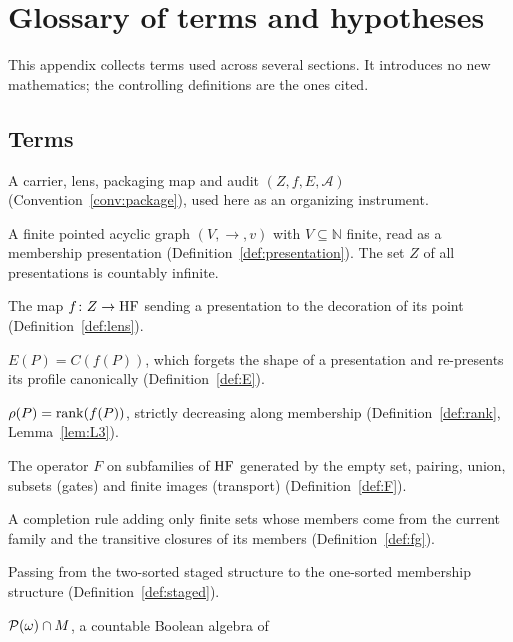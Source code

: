 \section{Glossary of terms and hypotheses}\label{app:definitions}

This appendix collects terms used across several sections. It introduces no new mathematics; the
controlling definitions are the ones cited.

\subsection{Terms}\label{subsec:definitions-list}

\begin{description}[style=multiline,leftmargin=!,labelwidth=0.27\textwidth,labelsep=0.8em,itemsep=3pt]
\item[Theory package.] A carrier, lens, packaging map and audit $(Z,f,E,\mathcal A)$
(Convention~\ref{conv:package}), used here as an organizing instrument.
\item[Presentation.] A finite pointed acyclic graph $(V,\to,v)$ with $V\subseteq\mathbb N$ finite,
read as a membership presentation (Definition~\ref{def:presentation}). The set $Z$ of all
presentations is countably infinite.
\item[Membership-profile lens.] The map $f\colon Z\to\mathrm{HF}$ sending a presentation to the decoration
of its point (Definition~\ref{def:lens}).
\item[Packaging map.] $E(P)=C(f(P))$, which forgets the shape of a presentation and re-presents its
profile canonically (Definition~\ref{def:E}).
\item[Rank audit.] $\rho(P)=\operatorname{rank}(f(P))$, strictly decreasing along membership
(Definition~\ref{def:rank}, Lemma~\ref{lem:L3}).
\item[Finite packaging operator.] The operator $F$ on subfamilies of $\mathrm{HF}$ generated by the empty
set, pairing, union, subsets (gates) and finite images (transport) (Definition~\ref{def:F}).
\item[Finitely generated rule.] A completion rule adding only finite sets whose members come from
the current family and the transitive closures of its members (Definition~\ref{def:fg}).
\item[Rank-erasure.] Passing from the two-sorted staged structure to the one-sorted membership
structure (Definition~\ref{def:staged}).
\item[Coded predicates $\mathcal B_M$.] $\mathcal{P}(\omega)\cap M$, a countable Boolean algebra of

\end{description}
